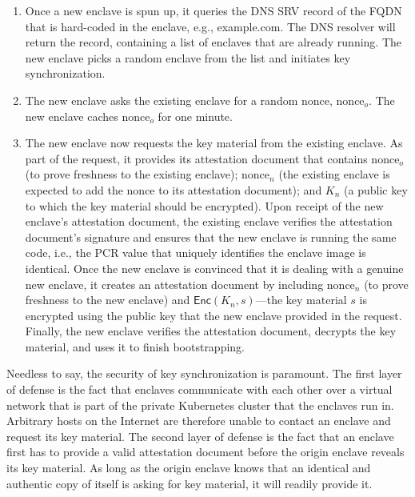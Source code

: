 \begin{enumerate}

  \item Once a new enclave is spun up, it queries the DNS SRV record of the FQDN
    that is hard-coded in the enclave, e.g., example.com.  The DNS resolver will
    return the record, containing a list of enclaves that are already running.
    The new enclave picks a random enclave from the list and initiates key
    synchronization.

  \item The new enclave asks the existing enclave for a random nonce,
    $\textrm{nonce}_o$.  The new enclave caches $\textrm{nonce}_o$ for one
    minute.

  \item The new enclave now requests the key material from the existing enclave.
    As part of the request, it provides its attestation document that contains
    $\textrm{nonce}_o$ (to prove freshness to the existing enclave);
    $\textrm{nonce}_n$ (the existing enclave is expected to add the nonce to its
    attestation document); and $K_n$ (a public key to which the key material
    should be encrypted).  Upon receipt of the new enclave's attestation
    document, the existing enclave verifies the attestation document's signature
    and ensures that the new enclave is running the same code, i.e., the PCR
    value that uniquely identifies the enclave image is identical.  Once the new
    enclave is convinced that it is dealing with a genuine new enclave, it
    creates an attestation document by including $\textrm{nonce}_n$ (to prove
    freshness to the new enclave) and $\textsf{Enc}(K_n, s)$---the key material
    $s$ is encrypted using the public key that the new enclave provided in the
    request.  Finally, the new enclave verifies the attestation document,
    decrypts the key material, and uses it to finish bootstrapping.

\end{enumerate}

Needless to say, the security of key synchronization is paramount.  The first
layer of defense is the fact that enclaves communicate with each other over a
virtual network that is part of the private Kubernetes cluster that the
enclaves run in.  Arbitrary hosts on the Internet are therefore unable to
contact an enclave and request its key material.  The second layer of defense
is the fact that an enclave first has to provide a valid attestation document
before the origin enclave reveals its key material.  As long as the origin
enclave knows that an identical and authentic copy of itself is asking for key
material, it will readily provide it.

